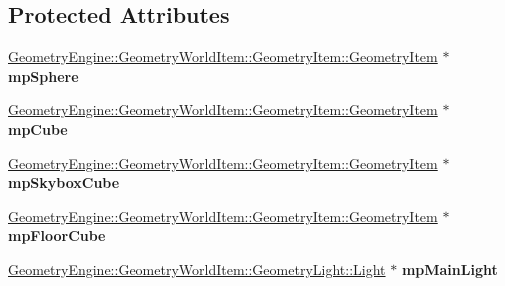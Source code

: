 \subsection*{Protected Attributes}
\begin{DoxyCompactItemize}
\item 
\mbox{\label{class_unit_test_1_1_c_translucent_shadows_scene_test_a1f3ba46e6038971aa7ad688cd3ad3385}} 
\mbox{\hyperlink{class_geometry_engine_1_1_geometry_world_item_1_1_geometry_item_1_1_geometry_item}{Geometry\+Engine\+::\+Geometry\+World\+Item\+::\+Geometry\+Item\+::\+Geometry\+Item}} $\ast$ {\bfseries mp\+Sphere}
\item 
\mbox{\label{class_unit_test_1_1_c_translucent_shadows_scene_test_ac99ff9734247db1b3cac249ec8004119}} 
\mbox{\hyperlink{class_geometry_engine_1_1_geometry_world_item_1_1_geometry_item_1_1_geometry_item}{Geometry\+Engine\+::\+Geometry\+World\+Item\+::\+Geometry\+Item\+::\+Geometry\+Item}} $\ast$ {\bfseries mp\+Cube}
\item 
\mbox{\label{class_unit_test_1_1_c_translucent_shadows_scene_test_a7b8134fab13861952da3dac6ff7c3584}} 
\mbox{\hyperlink{class_geometry_engine_1_1_geometry_world_item_1_1_geometry_item_1_1_geometry_item}{Geometry\+Engine\+::\+Geometry\+World\+Item\+::\+Geometry\+Item\+::\+Geometry\+Item}} $\ast$ {\bfseries mp\+Skybox\+Cube}
\item 
\mbox{\label{class_unit_test_1_1_c_translucent_shadows_scene_test_a51bb0a305b69aaa2393f16b70eaaaaf0}} 
\mbox{\hyperlink{class_geometry_engine_1_1_geometry_world_item_1_1_geometry_item_1_1_geometry_item}{Geometry\+Engine\+::\+Geometry\+World\+Item\+::\+Geometry\+Item\+::\+Geometry\+Item}} $\ast$ {\bfseries mp\+Floor\+Cube}
\item 
\mbox{\label{class_unit_test_1_1_c_translucent_shadows_scene_test_adf576868a7e4f8a19815e2decfcce445}} 
\mbox{\hyperlink{class_geometry_engine_1_1_geometry_world_item_1_1_geometry_light_1_1_light}{Geometry\+Engine\+::\+Geometry\+World\+Item\+::\+Geometry\+Light\+::\+Light}} $\ast$ {\bfseries mp\+Main\+Light}
\item 

\end{DoxyCompactItemize}
